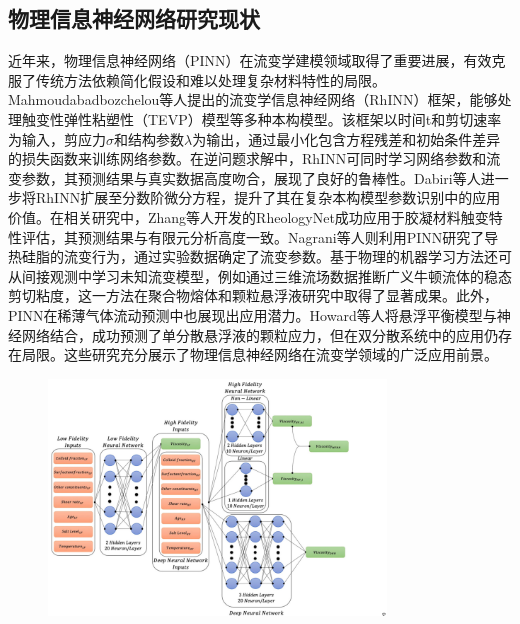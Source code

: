 \subsection{物理信息神经网络研究现状}
近年来，物理信息神经网络（PINN）在流变学建模领域取得了重要进展，有效克服了传统方法依赖简化假设和难以处理复杂材料特性的局限。Mahmoudabadbozchelou等人提出的流变学信息神经网络（RhINN）框架，能够处理触变性弹性粘塑性（TEVP）模型等多种本构模型\cite{mahmoudabadbozchelouRheologyInformedNeuralNetworks2021}。该框架以时间t和剪切速率为输入，剪应力$\sigma$和结构参数$\lambda$为输出，通过最小化包含方程残差和初始条件差异的损失函数来训练网络参数。在逆问题求解中，RhINN可同时学习网络参数和流变参数，其预测结果与真实数据高度吻合，展现了良好的鲁棒性。Dabiri等人进一步将RhINN扩展至分数阶微分方程，提升了其在复杂本构模型参数识别中的应用价值\cite{dabiri2023}。在相关研究中，Zhang等人开发的RheologyNet成功应用于胶凝材料触变特性评估，其预测结果与有限元分析高度一致\cite{zhangRheologyNetPhysicsinformedNeural2023}。Nagrani等人则利用PINN研究了导热硅脂的流变行为，通过实验数据确定了流变参数\cite{nagrani2023}。基于物理的机器学习方法还可从间接观测中学习未知流变模型，例如通过三维流场数据推断广义牛顿流体的稳态剪切粘度，这一方法在聚合物熔体和颗粒悬浮液研究中取得了显著成果。此外，PINN在稀薄气体流动预测中也展现出应用潜力\cite{tucnyLearningViscosityFunctions2024}。Howard等人将悬浮平衡模型与神经网络结合，成功预测了单分散悬浮液的颗粒应力，但在双分散系统中的应用仍存在局限。这些研究充分展示了物理信息神经网络在流变学领域的广泛应用前景\cite{howardMachineLearningMethods2023}。
\begin{figure}[htbp]
  \centering
  \includegraphics[width=0.8\textwidth]{Fig/MFNN.png}
\end{figure}

